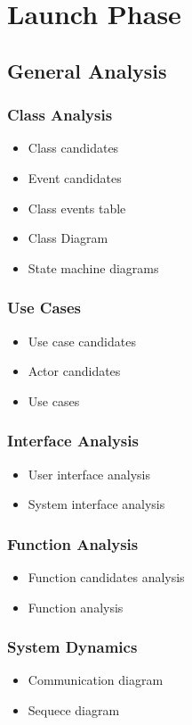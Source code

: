 \section{Launch Phase}
\subsection{General Analysis}
	\subsubsection{Class Analysis}
		\begin{itemize}
		  \item Class candidates
		  \item Event candidates
		  \item Class events table
		  \item Class Diagram
		  \item State machine diagrams
		\end{itemize}
	\subsubsection{Use Cases}
		\begin{itemize}
		  \item Use case candidates
		  \item Actor candidates
		  \item Use cases
		\end{itemize}
	\subsubsection{Interface Analysis}
		\begin{itemize}
		  \item User interface analysis
		  \item System interface analysis
		\end{itemize}
	\subsubsection{Function Analysis}
		\begin{itemize}
		  \item Function candidates analysis
		  \item Function analysis
		\end{itemize}
	\subsubsection{System Dynamics}
		\begin{itemize}
		  \item Communication diagram
		  \item Sequece diagram
		\end{itemize}
